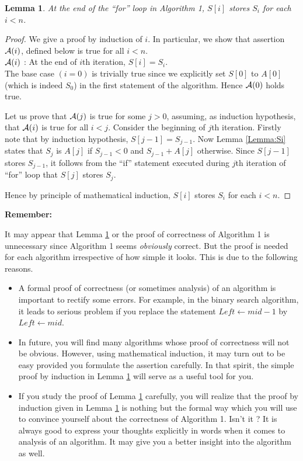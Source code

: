 \documentclass[11pt]{article}
\newtheorem{lemma}[theorem]{Lemma}
\begin{document}
\begin{lemma}
At the end of the ``for'' loop in Algorithm 1, $S[i]$ stores $S_i$ for each $i<n$.
\label{Lemma:correct}
\end{lemma}
\begin{proof}
We give a proof by induction of $i$. In particular, we show that assertion
${\cal A}(i)$, defined below is true for all $i<n$.\\
${\cal A}(i)$ : At the end of $i$th iteration, $S[i]=S_i$. \\
\noindent
The base case $(i=0)$ is trivially true since we explicitly set $S[0]$ 
to $A[0]$ (which is indeed $S_0$) in the first statement of the algorithm. 
Hence ${\cal A}(0)$ holds true.

Let us prove that ${\cal A}(j)$ is true for some $j>0$, assuming, as induction
hypothesis, that ${\cal A}(i)$ is true for all $i<j$.
Consider the beginning of $j$th iteration. Firstly note that by induction
hypothesis, $S[j-1]=S_{j-1}$. Now Lemma \ref{Lemma:Si} states that $S_j$
is $A[j]$ if $S_{j-1}<0$ and $S_{j-1}+A[j]$ otherwise. Since $S[j-1]$ stores
$S_{j-1}$, it follows from the ``if'' statement executed during $j$th iteration
of ``for'' loop that $S[j]$ stores $S_j$.

Hence by principle of mathematical induction, $S[i]$ stores $S_i$ for
each $i<n$.   
\end{proof}

\begin{large}\textbf{Remember:}\end{large}
It may appear that Lemma \ref{Lemma:correct} or the proof of correctness
of Algorithm 1 is unnecessary since Algorithm 1 seems {\em obviously} correct. 
But the proof is needed for each algorithm irrespective of how simple it looks.
This is due to the following reasons. 
\begin{itemize}
\item
A formal proof of correctness (or sometimes analysis) of an algorithm
is important to rectify some errors. For example, in the binary search 
algorithm, it leads to serious problem if you replace the statement 
$Left \leftarrow mid-1$ by $Left\leftarrow mid$. 
\item
In future, you will find many algorithms whose proof of correctness will not
be obvious. However, using mathematical induction, it may turn out to be
easy provided you formulate the assertion carefully. In that spirit, the
simple proof by induction in Lemma \ref{Lemma:correct} will serve as a useful 
tool for you.
\item If you study the proof of Lemma \ref{Lemma:correct} carefully, you will 
realize that the proof by induction given in Lemma \ref{Lemma:correct} is
nothing but the formal way which you will use to convince yourself about the 
correctness  of Algorithm 1. Isn't it ? It is always good to express your 
thoughts explicitly in words when it comes to analysis of an algorithm. 
It may give you a better insight into the algorithm as well.
\end{itemize}
\end{document}
